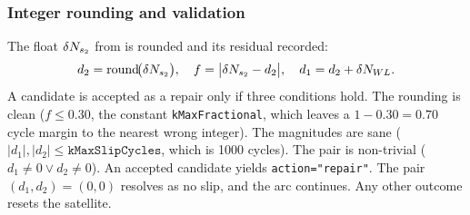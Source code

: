\documentclass[main.tex]{subfiles}
\begin{document}
\subsubsection{Integer rounding and validation}\label{sec:slip-te-round}

The float $\delta N_{s_2}$ from  is rounded and
its residual recorded:
\begin{equation}
d_2 = \operatorname{round}\!\bigl(\delta N_{s_2}\bigr),
\quad
f = \bigl|\delta N_{s_2} - d_2\bigr|,
\quad
d_1 = d_2 + \delta N_{WL}.
\label{eq:te-round}
\end{equation}
A candidate is accepted as a repair only if three conditions hold.  The
rounding is clean ($f \le 0.30$, the constant \texttt{kMaxFractional},
which leaves a $1 - 0.30 = 0.70$ cycle margin to the nearest wrong
integer).  The magnitudes are sane
($|d_1|, |d_2| \le \texttt{kMaxSlipCycles}$, which is 1000 cycles).  The
pair is non-trivial ($d_1 \neq 0 \lor d_2 \neq 0$).  An accepted
candidate yields \texttt{action="repair"}.  The pair
$(d_1, d_2) = (0, 0)$ resolves as no slip, and the arc continues.  Any
other outcome resets the satellite.
\end{document}

